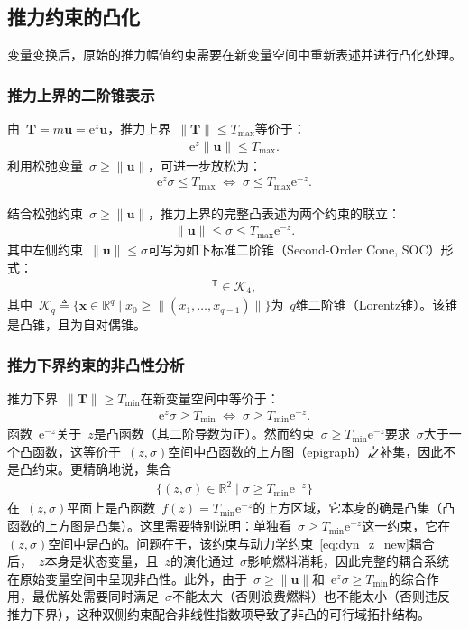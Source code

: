 \subsection{推力约束的凸化}\label{sec:thrust_convex}

变量变换后，原始的推力幅值约束需要在新变量空间中重新表述并进行凸化处理。

\subsubsection{推力上界的二阶锥表示}

由~$\bm T = m\bm u = \mathrm{e}^z\bm u$，推力上界~$\|\bm T\|\le T_{\max}$等价于：
\begin{align}
\mathrm{e}^z\|\bm u\| \le T_{\max}.
\end{align}
利用松弛变量~$\sigma\ge\|\bm u\|$，可进一步放松为：
\begin{align}
\mathrm{e}^z\sigma \le T_{\max}\;\Longleftrightarrow\; \sigma \le T_{\max}\mathrm{e}^{-z}.
\end{align}

结合松弛约束~$\sigma\ge\|\bm u\|$，推力上界的完整凸表述为两个约束的联立：
\begin{align}
\|\bm u\| \le \sigma \le T_{\max}\mathrm{e}^{-z}.
\end{align}
其中左侧约束~$\|\bm u\|\le\sigma$可写为如下标准二阶锥（Second-Order Cone, SOC）形式：
\begin{align}
[\sigma,\;u_x,\;u_y,\;u_z]^{\mathsf T} \in \mathcal K_4,
\end{align}
其中~$\mathcal K_q\triangleq\{\bm x\in\mathbb{R}^q\mid x_0\ge\|(x_1,\dots,x_{q-1})\|\}$为~$q$维二阶锥（Lorentz锥）。该锥是凸锥，且为自对偶锥。

\subsubsection{推力下界约束的非凸性分析}

推力下界~$\|\bm T\|\ge T_{\min}$在新变量空间中等价于：
\begin{align}
\mathrm{e}^z\sigma \ge T_{\min}\;\Longleftrightarrow\; \sigma \ge T_{\min}\mathrm{e}^{-z}.
\end{align}
函数~$\mathrm{e}^{-z}$关于~$z$是凸函数（其二阶导数为正）。然而约束~$\sigma\ge T_{\min}\mathrm{e}^{-z}$要求~$\sigma$大于一个凸函数，这等价于~$(z,\sigma)$空间中凸函数的上方图（epigraph）之补集，因此不是凸约束。更精确地说，集合
\begin{align}
\{(z,\sigma)\in\mathbb{R}^2\mid \sigma \ge T_{\min}\mathrm{e}^{-z}\}
\end{align}
在~$(z,\sigma)$平面上是凸函数~$f(z)=T_{\min}\mathrm{e}^{-z}$的上方区域，它本身的确是凸集（凸函数的上方图是凸集）。这里需要特别说明：单独看~$\sigma\ge T_{\min}\mathrm{e}^{-z}$这一约束，它在~$(z,\sigma)$空间中是凸的。问题在于，该约束与动力学约束~\eqref{eq:dyn_z_new}耦合后，~$z$本身是状态变量，且~$z$的演化通过~$\sigma$影响燃料消耗，因此完整的耦合系统在原始变量空间中呈现非凸性。此外，由于~$\sigma\ge\|\bm u\|$和~$\mathrm{e}^z\sigma\ge T_{\min}$的综合作用，最优解处需要同时满足~$\sigma$不能太大（否则浪费燃料）也不能太小（否则违反推力下界），这种双侧约束配合非线性指数项导致了非凸的可行域拓扑结构。

